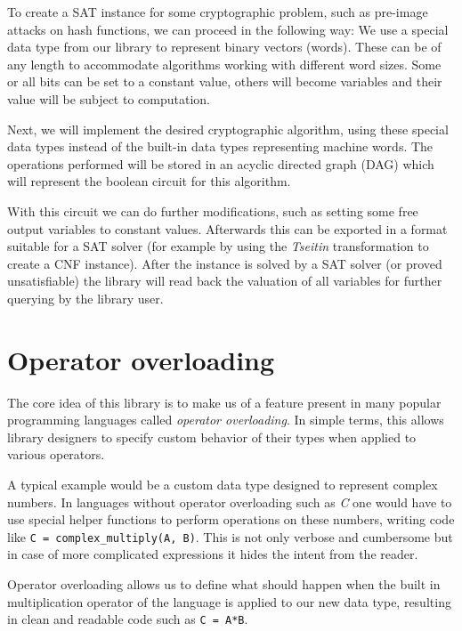 To create a SAT instance for some cryptographic problem, such as pre-image attacks on hash functions, we can proceed in the following way:
We use a special data type from our library to represent binary vectors (words).
These can be of any length to accommodate algorithms working with different word sizes.
Some or all bits can be set to a constant value, others will become variables and their value will be subject to computation.

Next, we will implement the desired cryptographic algorithm, using these special data types instead of the built-in data types representing machine words.
The operations performed will be stored in an acyclic directed graph (DAG) which will represent the boolean circuit for this algorithm.

With this circuit we can do further modifications, such as setting some free output variables to constant values.
Afterwards this can be exported in a format suitable for a SAT solver (for example by using the \emph{Tseitin} transformation to create a CNF instance).
After the instance is solved by a SAT solver (or proved unsatisfiable) the library will read back the valuation of all variables for further querying by the library user.

\section{Operator overloading}

The core idea of this library is to make us of a feature present in many popular programming languages called \emph{operator overloading}.
In simple terms, this allows library designers to specify custom behavior of their types when applied to various operators.

A typical example would be a custom data type designed to represent complex numbers.
In languages without operator overloading such as \emph{C} one would have to use special helper functions to perform operations on these numbers, writing code like \texttt{C = complex\_multiply(A, B)}.
This is not only verbose and cumbersome but in case of more complicated expressions it hides the intent from the reader.

Operator overloading allows us to define what should happen when the built in multiplication operator of the language is applied to our new data type, resulting in clean and readable code such as \texttt{C = A*B}.

~ \\

